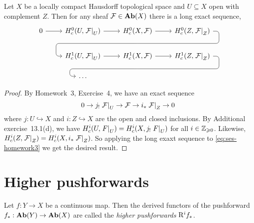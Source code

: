 \documentclass[../main.tex]{subfiles}
\begin{document}
\begin{lem}
    Let $X$ be a locally compact Hausdorff topological space and $U\subseteq X$ open with complement $Z$. Then for any sheaf $\mathcal{F} \in \mathbf{Ab}(X)$ there is a long exact sequence,
    \[\begin{tikzcd}
            0 \ar[r] & H^0_c(U, \restr{\sh F}{U}) \ar[r] & H^0_c(X, \sh F) \ar[r] \ar[draw=none]{d}[name=X, anchor=center]{} & H^0_c(Z, \restr{\sh F}{Z})
            \ar[rounded corners,
            to path={ -- ([xshift=2ex]\tikztostart.east)
                      |- (X.center) \tikztonodes
                      -| ([xshift=-2ex]\tikztotarget.west)
                      -- (\tikztotarget)}]{dll}[at end]{} \\
            & H^1_c(U, \restr{\sh F}{U}) \ar[r] & H^1_c(X, \sh F) \ar[r] \ar[draw=none]{d}[name=Y, anchor=center]{} & H^1_c(Z, \restr{\sh F}{Z})
            \ar[rounded corners,
            to path={ -- ([xshift=2ex]\tikztostart.east)
                      |- (Y.center) \tikztonodes
                      -| ([xshift=-2ex]\tikztotarget.west)
                      -- (\tikztotarget)}]{dll}[at end]{} \\
            & \dots & {} & {}
    \end{tikzcd}\]
\end{lem}
\begin{proof}
    By Homework~3, Exercise~4, we have an exact sequence
    \begin{equation}\label{eq:ses-homework3}
        0 \to j_{!} \left.\mathcal{F}\right|_{U} \to \mathcal{F} \to i_*\left.\mathcal{F}\right|_{Z} \to 0
    \end{equation}
     where $j\colon U\hookrightarrow X$ and $i\colon Z\hookrightarrow X$ are the open and closed inclusions. By Additional exercise~13.1(d), we have
    $H^i_c(U, \left.F\right|_{U}) = H^i_c(X, j_{!}\left.F\right|_{U})$ for all $i\in \mathbb{Z}_{\geqslant 0}$. Likewise, $H^i_c(Z, \left.\mathcal{F}\right|_{Z}) = H^i_c(X, i_* \left.\mathcal{F}\right|_{Z})$. So applying the long exaxt sequence to \ref{eq:ses-homework3} we get the desired result.
\end{proof}


\section{Higher pushforwards}

\begin{defn}
    Let $f\colon Y \to X$ be a continuous map.
    Then the derived functors of the pushforward $f_*\colon \catAbelianGroup(Y) \to \catAbelianGroup(X)$ are called the \emph{higher pushforwards} $\mathrm{R}^i f_*$. 
\end{defn}
\end{document}
